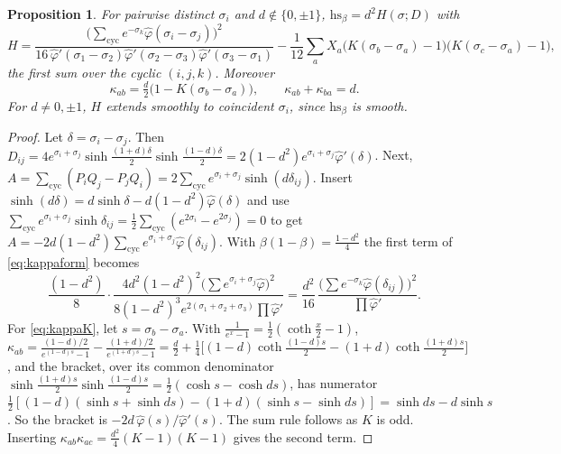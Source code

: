 \documentclass[11pt]{amsart}
\newtheorem{proposition}[theorem]{Proposition}
\theoremstyle{definition}
\numberwithin{equation}{section}
\newcommand{\hs}{\mathrm{hs}}
\newcommand{\ph}{\hat\varphi}
\begin{document}
\begin{proposition}\label{prop:H}
For pairwise distinct $\sigma_i$ and $d\notin\{0,\pm1\}$, $\hs_\beta=d^2H(\sigma;D)$ with
\begin{equation}\label{eq:H}
H=\frac{\big(\sum_{\mathrm{cyc}}e^{-\sigma_k}\ph(\sigma_i-\sigma_j)\big)^2}{16\,\ph'(\sigma_1-\sigma_2)\ph'(\sigma_2-\sigma_3)\ph'(\sigma_3-\sigma_1)}
-\frac1{12}\sum_aX_a\big(K(\sigma_b-\sigma_a)-1\big)\big(K(\sigma_c-\sigma_a)-1\big),
\end{equation}
the first sum over the cyclic $(i,j,k)$. Moreover
\begin{equation}\label{eq:kappaK}
\kappa_{ab}=\tfrac d2\big(1-K(\sigma_b-\sigma_a)\big),\qquad \kappa_{ab}+\kappa_{ba}=d .
\end{equation}
For $d\ne0,\pm1$, $H$ extends smoothly to coincident $\sigma_i$, since $\hs_\beta$ is smooth.
\end{proposition}
\begin{proof}
Let $\delta=\sigma_i-\sigma_j$. Then $D_{ij}=4e^{\sigma_i+\sigma_j}\sinh\frac{(1+d)\delta}2\sinh\frac{(1-d)\delta}2=2(1-d^2)e^{\sigma_i+\sigma_j}\ph'(\delta)$. Next,
$A=\sum_{\mathrm{cyc}}(P_iQ_j-P_jQ_i)=2\sum_{\mathrm{cyc}}e^{\sigma_i+\sigma_j}\sinh(d\delta_{ij})$. Insert $\sinh(d\delta)=d\sinh\delta-d(1-d^2)\ph(\delta)$ and use
$\sum_{\mathrm{cyc}}e^{\sigma_i+\sigma_j}\sinh\delta_{ij}=\frac12\sum_{\mathrm{cyc}}(e^{2\sigma_i}-e^{2\sigma_j})=0$ to get $A=-2d(1-d^2)\sum_{\mathrm{cyc}}e^{\sigma_i+\sigma_j}\ph(\delta_{ij})$. With
$\beta(1-\beta)=\frac{1-d^2}4$ the first term of \eqref{eq:kappaform} becomes
\[\frac{(1-d^2)}{8}\cdot\frac{4d^2(1-d^2)^2\big(\sum e^{\sigma_i+\sigma_j}\ph\big)^2}{8(1-d^2)^3e^{2(\sigma_1+\sigma_2+\sigma_3)}\prod\ph'}=\frac{d^2}{16}\,\frac{\big(\sum e^{-\sigma_k}\ph(\delta_{ij})\big)^2}{\prod\ph'} .\]
For \eqref{eq:kappaK}, let $s=\sigma_b-\sigma_a$. With $\frac1{e^x-1}=\frac12(\coth\frac x2-1)$,
$\kappa_{ab}=\frac{(1-d)/2}{e^{(1-d)s}-1}-\frac{(1+d)/2}{e^{(1+d)s}-1}=\frac d2+\frac14\big[(1-d)\coth\frac{(1-d)s}2-(1+d)\coth\frac{(1+d)s}2\big]$, and the bracket, over its common denominator
$\sinh\frac{(1+d)s}2\sinh\frac{(1-d)s}2=\frac12(\cosh s-\cosh ds)$, has numerator $\frac12[(1-d)(\sinh s+\sinh ds)-(1+d)(\sinh s-\sinh ds)]=\sinh ds-d\sinh s$. So the bracket is
$-2d\,\ph(s)/\ph'(s)$. The sum rule follows as $K$ is odd. Inserting $\kappa_{ab}\kappa_{ac}=\frac{d^2}4(K-1)(K-1)$ gives the second term.
\end{proof}
\end{document}
